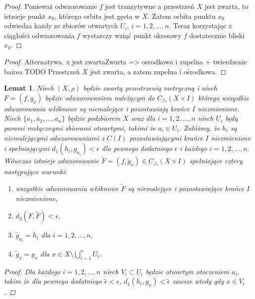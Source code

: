 \documentclass[licencjacka]{pwr_wmat_praca_dyplomowa}
\theoremstyle{plain}
\numberwithin{theorem}{chapter}
\newtheorem{lemma}[theorem]{Lemat}
\theoremstyle{definition}
\numberwithin{theorem}{chapter}
\begin{document}
\begin{proof}
Ponieważ odwzorowanie $f$ jest tranzytywne a przestrzeń $X$ jest zwarta, to istnieje punkt $x_0$, którego orbita jest gęsta w $X$. Zatem orbita punktu $x_0$ odwiedza każdy ze zbiorów otwartych $U_i, \, i = 1,2,\ldots,n.$ Teraz korzystając z ciągłości odwzorowania $f$ wystarczy wziąć punkt okresowy $f$ dostatecznie bliski $x_0.$
\end{proof}

\begin{proof}
Alternatywa.
x jest zwartaZwarta => osrodkowa i zupelna + twierdzenie bairea
TODO
Przestrzeń $X$ jest zwarta, a zatem zupełna i ośrodkowa.
\end{proof}



\begin{lemma}
\label{lemat_4_glownego_artykulu}
\cite{alseda1999entropy}
Niech $(X, \rho)$ będzie zwartą przestrzenią metryczną i niech $F = (f, g_x)$ będzie odwzorowaniem należącym do $C_\triangle(X \times I)$ którego wszystkie odwzorowania włóknowe są niemalejące i pozostawiają krańce $I$ niezmienione. Niech $\{a_1, a_2, \ldots, a_n\}$ będzie podzbiorem $X$ oraz dla $i = 1, 2, \ldots, n$ niech $U_i$ będą parami rozłącznymi zbiorami otwartymi, takimi że $a_i \in U_i$. Załóżmy, że $h_i$ są niemalejącymi odwzorowaniami z $C(I)$ pozostawiającymi krańce $I$ niezmienione i spełniającymi $d_1(h_i, g_{a_i}) < \epsilon$ dla pewnego dodatniego $\epsilon$ i każdego $i = 1, 2, \ldots, n$. Wówczas istnieje odwzorowanie $\widetilde{F} = (f, \widetilde{g}_x) \in C_\triangle(X \times I)$ spełniające cztery następujące warunki:

\begin{enumerate}
\item  wszystkie odwzorowania włóknowe $\widetilde{F}$ są niemalejące i pozostawiające krańce $I$ niezmienione,
\item $d_2(F, \widetilde{F}) < \epsilon$,
\item $\widetilde{g}_{a_i} = h_i$ dla $i = 1,2,\ldots,n$,
\item $\widetilde{g}_x = g_x$ dla $x \in X \setminus \bigcup_{i=1}^n U_i$.
\end{enumerate}

\begin{proof}
\cite{alseda1999entropy}
Dla każdego $i = 1, 2, \ldots, n$ niech $V_i \subset U_i$ będzie otwartym otoczeniem $a_i,$ takim że dla pewnego dodatniego $\widetilde{\epsilon} < \epsilon$, $d_1(h_i, g_x) < \widetilde{\epsilon}$ zawsze wtedy gdy $x \in V_i$.


\end{proof}
\end{lemma}
\end{document}
